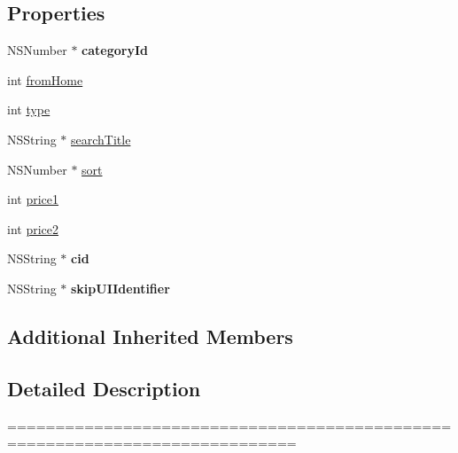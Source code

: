 \subsection*{Properties}
\begin{DoxyCompactItemize}
\item 
\mbox{\label{interface_product_c_v_view_controller_a34452290daa12a35859cc3a322e394ba}} 
N\+S\+Number $\ast$ {\bfseries category\+Id}
\item 
int \mbox{\hyperlink{interface_product_c_v_view_controller_a755dc4143e4c161c22b016d7106bac37}{from\+Home}}
\item 
int \mbox{\hyperlink{interface_product_c_v_view_controller_a8353e1f02331874efef572ec9208a7f2}{type}}
\item 
N\+S\+String $\ast$ \mbox{\hyperlink{interface_product_c_v_view_controller_ad69f62d463e238463098e16de9a935b9}{search\+Title}}
\item 
N\+S\+Number $\ast$ \mbox{\hyperlink{interface_product_c_v_view_controller_a87726fd521c71bc5d81a18ffd1558ddd}{sort}}
\item 
int \mbox{\hyperlink{interface_product_c_v_view_controller_a268454c4a78a4acf89c22a4b5fc0b6cd}{price1}}
\item 
int \mbox{\hyperlink{interface_product_c_v_view_controller_a2a4c8d068dcd053edb1ea82b9dbe82de}{price2}}
\item 
\mbox{\label{interface_product_c_v_view_controller_a7d3c7acceeef4a2d526a4642ca447d0c}} 
N\+S\+String $\ast$ {\bfseries cid}
\item 
\mbox{\label{interface_product_c_v_view_controller_ab2b56c0ebca31da83a8d1a7742e52255}} 
N\+S\+String $\ast$ {\bfseries skip\+U\+I\+Identifier}
\end{DoxyCompactItemize}
\subsection*{Additional Inherited Members}


\subsection{Detailed Description}
============================================================================

